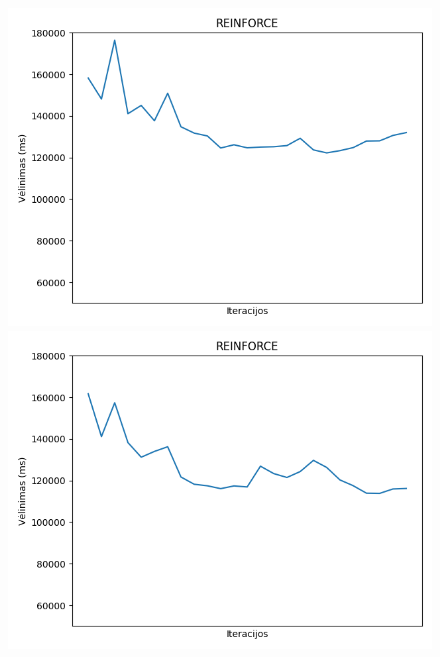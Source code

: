 \documentclass{VUMIFPSbakalaurinis}
\begin{document}
\begin{figure}[H]
    \centering
    \begin{minipage}[b]{0.45\textwidth}
        \includegraphics[width=\textwidth]{img/reinforce_50_2.png}
    \end{minipage}
    \hspace{1mm}
    \begin{minipage}[b]{0.45\textwidth}
        \includegraphics[width=\textwidth]{img/reinforce_100_2.png}
    \end{minipage}
    \hspace{1mm}
    \begin{minipage}[b]{0.45\textwidth}

\end{minipage}
\end{figure}
\end{document}
